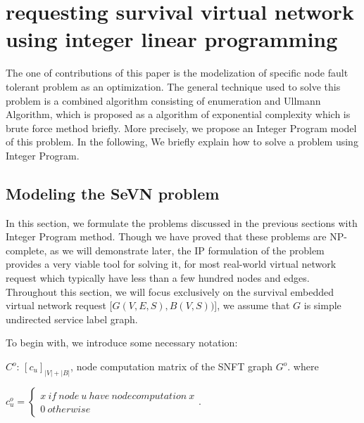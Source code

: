 
\section{requesting survival virtual network using integer linear programming}
\label{sec:SeVN_ILP}
The one of contributions of this paper is the modelization of specific node fault tolerant problem as an optimization. The general technique used to solve this problem is a combined algorithm consisting of enumeration and Ullmann Algorithm\cite{ullmann1976algorithm}, which is proposed as a  algorithm of exponential complexity which is brute force method briefly. More precisely, we propose an Integer Program\cite{schrijver1998theory} model of this problem. In the following, We briefly explain how to solve a problem using Integer Program.

\subsection{Modeling the SeVN problem}
In this section, we formulate the problems discussed in the previous sections with Integer Program method. Though we have proved that these problems are NP-complete, as we will demonstrate later, the IP formulation of the problem provides a very viable tool for solving it, for most real-world virtual network request which typically have less than a few hundred nodes and edges. Throughout this section, we will focus exclusively on the survival embedded virtual network request [$G(V,E,S),B(V,S))$], we assume that $G$ is simple undirected service label graph.


To begin with, we introduce some necessary notation:

$C^o$: $[c_{u}]_{|V|+|B|}$, node computation matrix of the SNFT graph $G^o$. where

${c^o_{u}}=\left\{ \begin{array}{l}x\ if\ node\ u\ have\ node computation\ x\\
0\ otherwise
\end{array} \right.$.

